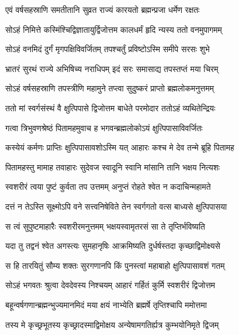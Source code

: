 \twolineshloka
{एवं वर्षसहस्राणि समतीतानि सुव्रत}
{राज्यं कारयतो ब्रह्मन्प्रजा धर्मेण रक्षतः} %

\twolineshloka
{सोऽहं निमित्ते कस्मिंश्चिद्विज्ञातायुर्द्विजोत्तम}
{कालधर्मं हृदि न्यस्य ततो वनमुपागमम्} %

\twolineshloka
{सोऽहं वनमिदं दुर्गं मृगपक्षिविवर्जितम्}
{तपश्चर्तुं प्रविष्टोऽस्मि समीपे सरसः शुभे} %

\twolineshloka
{भ्रातरं सुरथं राज्ये अभिषिच्य नराधिपम्}
{इदं सरः समासाद्य तपस्तप्तं मया चिरम्} %

\twolineshloka
{सोऽहं वर्षसहस्राणि तपस्त्रीणि महामुने}
{तप्त्वा सुदुष्करं प्राप्तो ब्रह्मलोकमनुत्तमम्} %

\twolineshloka
{ततो मां स्वर्गसंस्थं वै क्षुत्पिपासे द्विजोत्तम}
{बाधेते परमोदार ततोऽहं व्यथितेन्द्रियः} %

\twolineshloka
{गत्वा त्रिभुवणश्रेष्ठं पितामहमुवाच ह}
{भगवन्ब्रह्मलोकोऽयं क्षुत्पिपासाविवर्जितः} %

\twolineshloka
{कस्येयं कर्मणः प्राप्तिः क्षुत्पिपासावशोऽस्मि यत्}
{आहारः कश्च मे देव तन्मे ब्रूहि पितामह} %

\twolineshloka
{पितामहस्तु मामाह तवाहारः सुदेवज}
{स्वादूनि स्वानि मांसानि तानि भक्षय नित्यशः} %

\twolineshloka
{स्वशरीरं त्वया पुष्टं कुर्वता तप उत्तमम्}
{अनुप्तं रोहते श्वेत न कदाचिन्महामते} %

\twolineshloka
{दत्तं न तेऽस्ति सूक्ष्मोऽपि वने सत्त्वनिषेविते}
{तेन स्वर्गगतो वत्स बाध्यसे क्षुत्पिपासया} %

\twolineshloka
{स त्वं सुपुष्टमाहारैः स्वशरीरमनुत्तमम्}
{भक्षयस्वामृतरसं सा ते तृप्तिर्भविष्यति} %

\twolineshloka
{यदा तु तद्वनं श्वेत अगस्त्यः सुमहानृषिः}
{आक्रमिष्यति दुर्धर्षस्तदा कृच्छाद्विमोक्ष्यसे} %

\twolineshloka
{स हि तारयितुं सौम्य शक्तः सुरगणानपि}
{किं पुनस्त्वां महाबाहो क्षुत्पिपासावशं गतम्} %

\twolineshloka
{सोऽहं भगवतः श्रुत्वा देवदेवस्य निश्चयम्}
{आहारं गर्हितं कुर्मि स्वशरीरं द्विजोत्तम} %

\twolineshloka
{बहून्वर्षगणान्ब्रह्मन्भुज्यमानमिदं मया}
{क्षयं नाभ्येति ब्रह्मर्षे तृप्तिश्चापि ममोत्तमा} %

\twolineshloka
{तस्य मे कृच्छ्रभूतस्य कृच्छ्रादस्माद्विमोक्षय}
{अन्येषामगतिर्ह्यत्र कुम्भयोनिमृते द्विजम्} %

